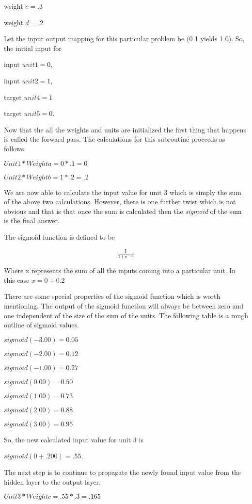 	weight $c = .3$ 

	weight $d = .2$

	Let the input output mapping for this particular problem be (0
1 yields 1 0).  So, the initial input for 

	input $unit 1 = 0$, 

	input $unit 2 = 1$,

        target $unit 4 = 1$ 

	target $unit 5 = 0$.

	Now that the all the weights and units are initialized the
first thing that happens is called the forward pass.  The calculations
for this subroutine proceeds as follows.

	$Unit 1 * Weight a = 0 * .1 = 0$

	$Unit 2 * Weight b = 1 * .2 = .2$

	We are now able to calculate the input value for unit 3 which
is simply the sum of the above two calculations.  However, there is
one further twist which is not obvious and that is that once the sum
is calculated then the {\it sigmoid} of the sum is the final answer.

	The sigmoid function is defined to be

	$$1 \over {1 + e ^ {-x}}$$

	Where x represents the sum of all the inputs coming into a
particular unit.  In this case $x = 0 + 0.2$

	There are some special properties of the sigmoid function
which is worth mentioning.  The output of the sigmoid function will
always be between zero and one independent of the size of the sum of
the units.  The following table is a rough outline of sigmoid values.

	$sigmoid(-3.00) = 0.05$

	$sigmoid(-2.00) = 0.12$

	$sigmoid(-1.00) = 0.27$

	$sigmoid( 0.00) = 0.50$

	$sigmoid( 1.00) = 0.73$

	$sigmoid( 2.00) = 0.88$

	$sigmoid( 3.00) = 0.95$

	So, the new calculated input value for unit 3 is

	$sigmoid(0 + .200) = .55$.  

	The next step is to continue to propagate the newly found
input value from the hidden layer to the output layer.

	$Unit 3 * Weight c = .55 * .3 = .165$

